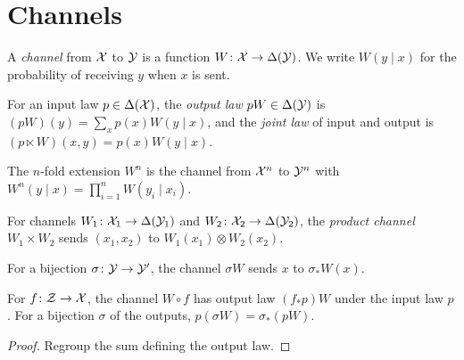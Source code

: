 \chapter{Channels}
\label{chap:channels}

\begin{definition}
  \label{def:channel}
  \leanok
  A \emph{channel} from $\mathcal X$ to $\mathcal Y$ is a function $W \colon \mathcal X \to \Delta(\mathcal Y)$.  We write
  $W(y \mid x)$ for the probability of receiving $y$ when $x$ is sent.
\end{definition}

\begin{definition}
  \label{def:output_joint}
  \leanok
  For an input law $p \in \Delta(\mathcal X)$, the \emph{output law} $pW \in \Delta(\mathcal Y)$ is
  $(pW)(y) = \sum_x p(x) W(y \mid x)$, and the \emph{joint law} of input and output is
  $(p \ltimes W)(x, y) = p(x) W(y \mid x)$.
\end{definition}

\begin{definition}
  \label{def:pow}
  \leanok
  The $n$-fold extension $W^n$ is the channel from $\mathcal X^n$ to $\mathcal Y^n$ with
  $W^n(y \mid x) = \prod_{i=1}^n W(y_i \mid x_i)$.
\end{definition}

\begin{definition}
  \label{def:channel_prod}
  \leanok
  For channels $W_1 \colon \mathcal X_1 \to \Delta(\mathcal Y_1)$ and $W_2 \colon \mathcal X_2 \to \Delta(\mathcal Y_2)$, the
  \emph{product channel} $W_1 \times W_2$ sends $(x_1, x_2)$ to $W_1(x_1) \otimes W_2(x_2)$.
\end{definition}

\begin{definition}
  \label{def:mapOutput}
  \leanok
  For a bijection $\sigma \colon \mathcal Y \to \mathcal Y'$, the channel $\sigma W$ sends $x$ to $\sigma_* W(x)$.
\end{definition}

\begin{lemma}
  \label{lem:output_relabel}
  \leanok
  For $f \colon \mathcal Z \to \mathcal X$, the channel $W \circ f$ has output law $(f_* p) W$ under the input law $p$.
  For a bijection $\sigma$ of the outputs, $p(\sigma W) = \sigma_*(pW)$.
\end{lemma}
\begin{proof}
  \leanok
  Regroup the sum defining the output law.
\end{proof}

